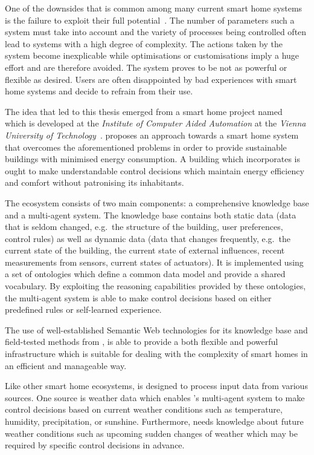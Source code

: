 One of the downsides that is common among many current smart home systems is the failure to exploit their full potential~\cite{HomeAutomationChallengesOpportunities,HomeMaestro,StateOfHomeNetworking}. The number of parameters such a system must take into account and the variety of processes being controlled often lead to systems with a high degree of complexity. The actions taken by the system become inexplicable while optimisations or customisations imply a huge effort and are therefore avoided. The system proves to be not as powerful or flexible as desired. Users are often disappointed by bad experiences with smart home systems and decide to refrain from their use.

The idea that led to this thesis emerged from a smart home project named \thinkhome~\cite{ThinkHomeWeb} which is developed at the \emph{Institute of Computer Aided Automation} at the \emph{Vienna University of Technology}~\cite{CR2011-TH_Journal,CR2010-DEST_ThinkHome}. \thinkhome proposes an approach towards a smart home system that overcomes the aforementioned problems in order to provide sustainable buildings with minimised energy consumption. A building which incorporates \thinkhome is ought to make understandable control decisions which maintain energy efficiency and comfort without patronising its inhabitants.

The \thinkhome ecosystem consists of two main components: a comprehensive knowledge base and a multi-agent system. The knowledge base contains both static data (data that is seldom changed, e.g.\ the structure of the building, user preferences, control rules) as well as dynamic data (data that changes frequently, e.g.\ the current state of the building, the current state of external influences, recent measurements from sensors, current states of actuators). It is implemented using a set of ontologies which define a common data model and provide a shared vocabulary. By exploiting the reasoning capabilities provided by these ontologies, the multi-agent system is able to make control decisions based on either predefined rules or self-learned experience.

The use of well-established Semantic Web technologies for its knowledge base and field-tested methods from , \thinkhome is able to provide a both flexible and powerful infrastructure which is suitable for dealing with the complexity of smart homes in an efficient and manageable way.

Like other smart home ecosystems, \thinkhome is designed to process input data from various sources. One source is weather data which enables \thinkhome's multi-agent system to make control decisions based on current weather conditions such as temperature, humidity, precipitation, or sunshine. Furthermore, \thinkhome needs knowledge about future weather conditions such as upcoming sudden changes of weather which may be required by specific control decisions in advance.

